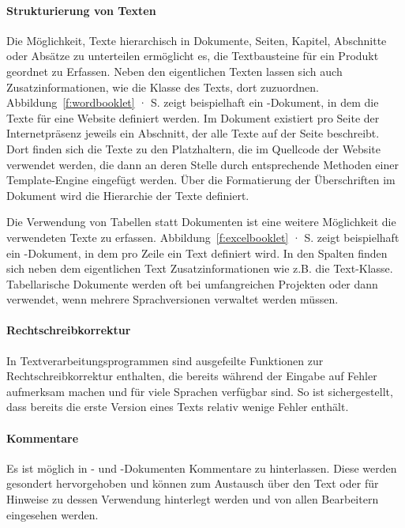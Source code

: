 \paragraph{Strukturierung von Texten} Die Möglichkeit, Texte hierarchisch in Dokumente, Seiten, Kapitel, Abschnitte oder Absätze zu unterteilen ermöglicht es, die Textbausteine für ein Produkt geordnet zu Erfassen. Neben den eigentlichen Texten lassen sich auch Zusatzinformationen, wie die Klasse des Texts, dort zuzuordnen. Abbildung~\ref{f:wordbooklet} · S.\pageref{f:wordbooklet} zeigt beispielhaft ein -Dokument, in dem die Texte für eine Website definiert werden. Im Dokument existiert pro Seite der Internetpräsenz jeweils ein Abschnitt, der alle Texte auf der Seite beschreibt. Dort finden sich die Texte zu den Platzhaltern, die im Quellcode der Website verwendet werden, die dann an deren Stelle durch entsprechende Methoden einer Template-Engine eingefügt werden. Über die Formatierung der Überschriften im Dokument wird die Hierarchie der Texte definiert. 

Die Verwendung von Tabellen statt Dokumenten ist eine weitere Möglichkeit die verwendeten Texte zu erfassen. Abbildung~\ref{f:excelbooklet} · S.\pageref{f:excelbooklet} zeigt beispielhaft ein -Dokument, in dem pro Zeile ein Text definiert wird. In den Spalten finden sich neben dem eigentlichen Text Zusatzinformationen wie z.B. die Text-Klasse. Tabellarische Dokumente werden oft bei umfangreichen Projekten oder dann verwendet, wenn mehrere Sprachversionen verwaltet werden müssen.

\paragraph{Rechtschreibkorrektur} In Textverarbeitungsprogrammen sind ausgefeilte Funktionen zur Rechtschreibkorrektur enthalten, die bereits während der Eingabe auf Fehler aufmerksam machen und für viele Sprachen verfügbar sind. So ist sichergestellt, dass bereits die erste Version eines Texts relativ wenige Fehler enthält.

\paragraph{Kommentare} Es ist möglich in - und -Dokumenten Kommentare zu hinterlassen. Diese werden gesondert hervorgehoben und können zum Austausch über den Text oder für Hinweise zu dessen Verwendung hinterlegt werden und von allen Bearbeitern eingesehen werden.

